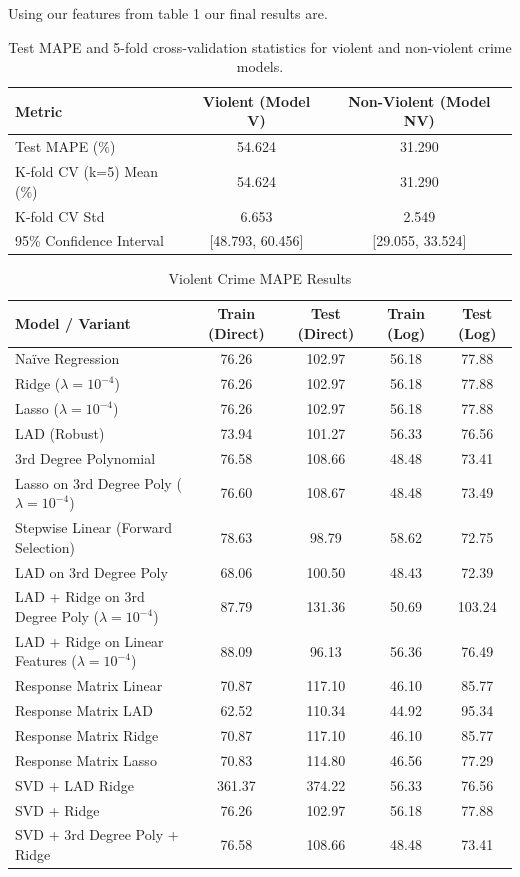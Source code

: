 \documentclass{article}
\begin{document}
\begin{noindent} Using our features from table 1 our final results are. 
\end{noindent}

\begin{table}[h!]
\centering
\begin{tabular}{|l|c|c|}
\hline
\textbf{Metric} & \textbf{Violent (Model V)} & \textbf{Non-Violent (Model NV)} \\
\hline
Test MAPE (\%) & 54.624 & 31.290 \\
\hline
K-fold CV (k=5) Mean (\%) & 54.624 & 31.290 \\
\hline
K-fold CV Std & 6.653 & 2.549 \\
\hline
95\% Confidence Interval & [48.793, 60.456] & [29.055, 33.524] \\
\hline
\end{tabular}
\caption{Test MAPE and 5-fold cross-validation statistics for violent and non-violent crime models.}
\label{tab:mape_cv}
\end{table}




\begin{table}[htbp]
\centering
\caption{Violent Crime MAPE Results}
\begin{tabular}{lcccc}
\hline
Model / Variant & Train (Direct) & Test (Direct) & Train (Log) & Test (Log) \\
\hline
Na\"ive Regression & 76.26 & 102.97 & 56.18 & 77.88 \\
Ridge ($\lambda=10^{-4}$) & 76.26 & 102.97 & 56.18 & 77.88 \\
Lasso ($\lambda=10^{-4}$) & 76.26 & 102.97 & 56.18 & 77.88 \\
LAD (Robust) & 73.94 & 101.27 & 56.33 & 76.56 \\
3rd Degree Polynomial & 76.58 & 108.66 & 48.48 & 73.41 \\
Lasso on 3rd Degree Poly ($\lambda=10^{-4}$) & 76.60 & 108.67 & 48.48 & 73.49 \\
Stepwise Linear (Forward Selection) & 78.63 & 98.79 & 58.62 & 72.75 \\
LAD on 3rd Degree Poly & 68.06 & 100.50 & 48.43 & 72.39 \\
LAD + Ridge on 3rd Degree Poly ($\lambda=10^{-4}$) & 87.79 & 131.36 & 50.69 & 103.24 \\
LAD + Ridge on Linear Features ($\lambda=10^{-4}$) & 88.09 & 96.13 & 56.36 & 76.49 \\
Response Matrix Linear & 70.87 & 117.10 & 46.10 & 85.77 \\
Response Matrix LAD & 62.52 & 110.34 & 44.92 & 95.34 \\
Response Matrix Ridge & 70.87 & 117.10 & 46.10 & 85.77 \\
Response Matrix Lasso & 70.83 & 114.80 & 46.56 & 77.29 \\
SVD + LAD Ridge & 361.37 & 374.22 & 56.33 & 76.56 \\
SVD + Ridge & 76.26 & 102.97 & 56.18 & 77.88 \\
SVD + 3rd Degree Poly + Ridge & 76.58 & 108.66 & 48.48 & 73.41 \\
\hline
\end{tabular}
\end{table}
\end{document}
